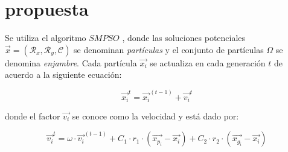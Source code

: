 \documentclass[spanish,twocolumn]{article}
\begin{document}
\section{propuesta}
\label{sec:propuesta}
Se utiliza el algoritmo $SMPSO$ \cite{4938830}, donde las soluciones potenciales $\overrightarrow{x}=(\mathcal{R}_x, \mathcal{R}_y, \mathcal{C})$ se denominan {\it partículas} y el conjunto de partículas $\Omega$ se denomina {\it enjambre}. Cada partícula $\overrightarrow{x_i}$ se actualiza en cada generación $t$ de acuerdo a la siguiente ecuación:

\begin{equation}\label{eq:psobasico}
\overrightarrow{x_i}^t = \overrightarrow{x_i}^{(t-1)} + \overrightarrow{v_i}^t
\end{equation}

donde el factor $\overrightarrow{v_i}$ se conoce como la velocidad y está dado por:

\begin{equation}\label{eq:psobasico2}
\overrightarrow{v_i}^t = \omega \cdot \overrightarrow{v_i}^{(t-1)} + C_1 \cdot r_1 \cdot (\overrightarrow{x_{p_i}}-\overrightarrow{x_i}) + C_2 \cdot r_2 \cdot (\overrightarrow{x_{g_i}}-\overrightarrow{x_i})
\end{equation}
\end{document}
